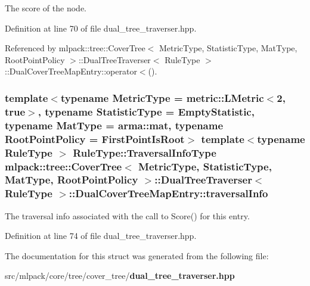 The score of the node. 



Definition at line 70 of file dual\+\_\+tree\+\_\+traverser.\+hpp.



Referenced by mlpack\+::tree\+::\+Cover\+Tree$<$ Metric\+Type, Statistic\+Type, Mat\+Type, Root\+Point\+Policy $>$\+::\+Dual\+Tree\+Traverser$<$ Rule\+Type $>$\+::\+Dual\+Cover\+Tree\+Map\+Entry\+::operator$<$().

\subsubsection[{traversal\+Info}]{\setlength{\rightskip}{0pt plus 5cm}template$<$typename Metric\+Type  = metric\+::\+L\+Metric$<$2, true$>$, typename Statistic\+Type  = Empty\+Statistic, typename Mat\+Type  = arma\+::mat, typename Root\+Point\+Policy  = First\+Point\+Is\+Root$>$ template$<$typename Rule\+Type $>$ Rule\+Type\+::\+Traversal\+Info\+Type {\bf mlpack\+::tree\+::\+Cover\+Tree}$<$ Metric\+Type, Statistic\+Type, Mat\+Type, Root\+Point\+Policy $>$\+::{\bf Dual\+Tree\+Traverser}$<$ Rule\+Type $>$\+::Dual\+Cover\+Tree\+Map\+Entry\+::traversal\+Info}\label{structmlpack_1_1tree_1_1CoverTree_1_1DualTreeTraverser_1_1DualCoverTreeMapEntry_a9e4483a26292f7f33ea7b16f3ae478a5}


The traversal info associated with the call to Score() for this entry. 



Definition at line 74 of file dual\+\_\+tree\+\_\+traverser.\+hpp.



The documentation for this struct was generated from the following file\+:\begin{DoxyCompactItemize}
\item 
src/mlpack/core/tree/cover\+\_\+tree/{\bf dual\+\_\+tree\+\_\+traverser.\+hpp}\end{DoxyCompactItemize}

